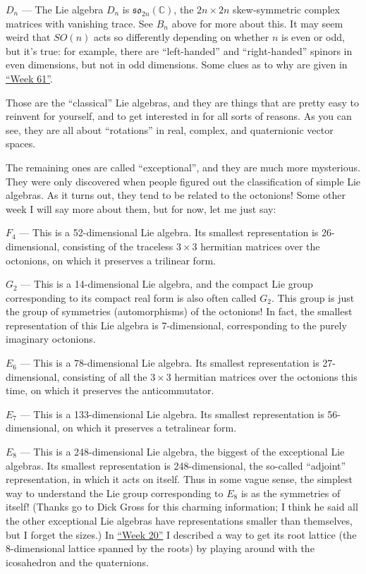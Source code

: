 \documentclass{article}
\begin{document}
\(D_n\) --- The Lie algebra \(D_n\) is
\(\mathfrak{so}_{2n}(\mathbb{C})\), the \(2n \times 2n\) skew-symmetric
complex matrices with vanishing trace. See \(B_n\) above for more about
this. It may seem weird that \(SO(n)\) acts so differently depending on
whether \(n\) is even or odd, but it's true: for example, there are
``left-handed'' and ``right-handed'' spinors in even dimensions, but not
in odd dimensions. Some clues as to why are given in
\protect\hyperlink{week61}{``Week 61''}.

Those are the ``classical'' Lie algebras, and they are things that are
pretty easy to reinvent for yourself, and to get interested in for all
sorts of reasons. As you can see, they are all about ``rotations'' in
real, complex, and quaternionic vector spaces.

The remaining ones are called ``exceptional'', and they are much more
mysterious. They were only discovered when people figured out the
classification of simple Lie algebras. As it turns out, they tend to be
related to the octonions! Some other week I will say more about them,
but for now, let me just say:

\(F_4\) --- This is a 52-dimensional Lie algebra. Its smallest
representation is 26-dimensional, consisting of the traceless
\(3\times3\) hermitian matrices over the octonions, on which it
preserves a trilinear form.

\(G_2\) --- This is a 14-dimensional Lie algebra, and the compact Lie
group corresponding to its compact real form is also often called
\(G_2\). This group is just the group of symmetries (automorphisms) of
the octonions! In fact, the smallest representation of this Lie algebra
is 7-dimensional, corresponding to the purely imaginary octonions.

\(E_6\) --- This is a 78-dimensional Lie algebra. Its smallest
representation is 27-dimensional, consisting of all the \(3\times3\)
hermitian matrices over the octonions this time, on which it preserves
the anticommutator.

\(E_7\) --- This is a 133-dimensional Lie algebra. Its smallest
representation is 56-dimensional, on which it preserves a tetralinear
form.

\(E_8\) --- This is a 248-dimensional Lie algebra, the biggest of the
exceptional Lie algebras. Its smallest representation is
248-dimensional, the so-called ``adjoint'' representation, in which it
acts on itself. Thus in some vague sense, the simplest way to understand
the Lie group corresponding to \(E_8\) is as the symmetries of itself!
(Thanks go to Dick Gross for this charming information; I think he said
all the other exceptional Lie algebras have representations smaller than
themselves, but I forget the sizes.) In
\protect\hyperlink{week20}{``Week 20''} I described a way to get its
root lattice (the 8-dimensional lattice spanned by the roots) by playing
around with the icosahedron and the quaternions.
\end{document}
